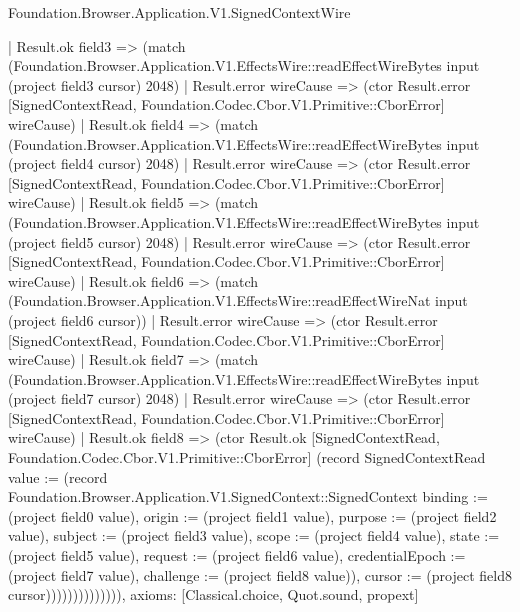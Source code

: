 \begin{lexlean}{Foundation.Browser.Application.V1.SignedContextWire}
\begin{semanticmodule}
{              | Result.ok field3 => (match (Foundation.Browser.Application.V1.EffectsWire::readEffectWireBytes input (project field3 cursor) 2048)
                | Result.error wireCause => (ctor Result.error [SignedContextRead, Foundation.Codec.Cbor.V1.Primitive::CborError] wireCause)
                | Result.ok field4 => (match (Foundation.Browser.Application.V1.EffectsWire::readEffectWireBytes input (project field4 cursor) 2048)
                  | Result.error wireCause => (ctor Result.error [SignedContextRead, Foundation.Codec.Cbor.V1.Primitive::CborError] wireCause)
                  | Result.ok field5 => (match (Foundation.Browser.Application.V1.EffectsWire::readEffectWireBytes input (project field5 cursor) 2048)
                    | Result.error wireCause => (ctor Result.error [SignedContextRead, Foundation.Codec.Cbor.V1.Primitive::CborError] wireCause)
                    | Result.ok field6 => (match (Foundation.Browser.Application.V1.EffectsWire::readEffectWireNat input (project field6 cursor))
                      | Result.error wireCause => (ctor Result.error [SignedContextRead, Foundation.Codec.Cbor.V1.Primitive::CborError] wireCause)
                      | Result.ok field7 => (match (Foundation.Browser.Application.V1.EffectsWire::readEffectWireBytes input (project field7 cursor) 2048)
                        | Result.error wireCause => (ctor Result.error [SignedContextRead, Foundation.Codec.Cbor.V1.Primitive::CborError] wireCause)
                        | Result.ok field8 => (ctor Result.ok [SignedContextRead, Foundation.Codec.Cbor.V1.Primitive::CborError] (record SignedContextRead {value := (record Foundation.Browser.Application.V1.SignedContext::SignedContext {binding := (project field0 value), origin := (project field1 value), purpose := (project field2 value), subject := (project field3 value), scope := (project field4 value), state := (project field5 value), request := (project field6 value), credentialEpoch := (project field7 value), challenge := (project field8 value)}), cursor := (project field8 cursor)}))))))))))))),
  axioms: [Classical.choice, Quot.sound, propext]
}


\end{semanticmodule}
\end{lexlean}
